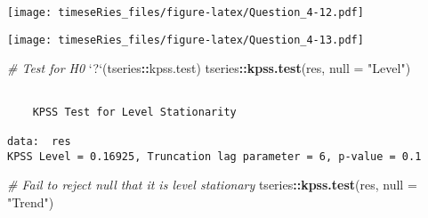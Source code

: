 \documentclass[]{book}
\newenvironment{Shaded}{\begin{snugshade}}{\end{snugshade}}
\newcommand{\CommentTok}[1]{\textcolor[rgb]{0.56,0.35,0.01}{\textit{#1}}}
\newcommand{\DataTypeTok}[1]{\textcolor[rgb]{0.13,0.29,0.53}{#1}}
\newcommand{\DecValTok}[1]{\textcolor[rgb]{0.00,0.00,0.81}{#1}}
\newcommand{\KeywordTok}[1]{\textcolor[rgb]{0.13,0.29,0.53}{\textbf{#1}}}
\newcommand{\NormalTok}[1]{#1}
\newcommand{\OperatorTok}[1]{\textcolor[rgb]{0.81,0.36,0.00}{\textbf{#1}}}
\newcommand{\StringTok}[1]{\textcolor[rgb]{0.31,0.60,0.02}{#1}}
\begin{document}
\begin{Shaded}
\end{Shaded}

\texttt{[image: timeseRies\_files/figure-latex/Question\_4-12.pdf]}

\begin{Shaded}
\end{Shaded}

\texttt{[image: timeseRies\_files/figure-latex/Question\_4-13.pdf]}

\begin{Shaded}
\begin{Highlighting}[]
\CommentTok{# Test for H0}
\StringTok{`}\DataTypeTok{?}\StringTok{`}\NormalTok{(tseries}\OperatorTok{::}\NormalTok{kpss.test)}
\NormalTok{tseries}\OperatorTok{::}\KeywordTok{kpss.test}\NormalTok{(res, }\DataTypeTok{null =} \StringTok{"Level"}\NormalTok{)}
\end{Highlighting}
\end{Shaded}

\begin{verbatim}

    KPSS Test for Level Stationarity

data:  res
KPSS Level = 0.16925, Truncation lag parameter = 6, p-value = 0.1
\end{verbatim}

\begin{Shaded}
\begin{Highlighting}[]
\CommentTok{# Fail to reject null that it is level stationary}
\NormalTok{tseries}\OperatorTok{::}\KeywordTok{kpss.test}\NormalTok{(res, }\DataTypeTok{null =} \StringTok{"Trend"}\NormalTok{)}
\end{Highlighting}
\end{Shaded}
\end{document}
